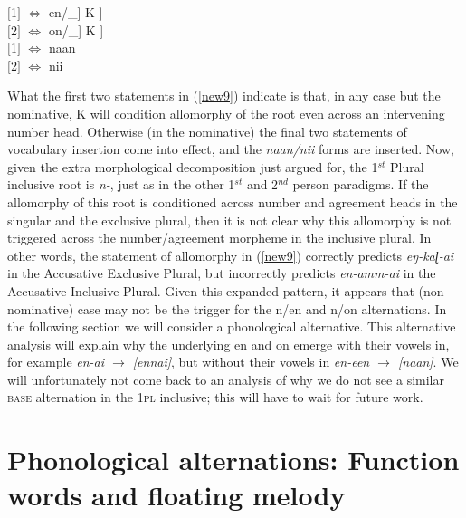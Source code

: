\documentclass[output=paper,colorlinks,citecolor=brown,
]{langscibook}
\begin{document}
\begin{exe}
\ex \label{new9}
$[$1$]$ \hspace{6pt} $\Leftrightarrow$  \hspace{5pt}    en/\_] K ] \\
$[$2$]$ \hspace{5pt} $\Leftrightarrow$  \hspace{5pt}    on/\_] K ] \\
$[$1$]$ \hspace{6pt} $\Leftrightarrow$  \hspace{5pt}  naan\\
$[$2$]$ \hspace{5pt} $\Leftrightarrow$  \hspace{5pt}  nii\\
\end{exe}

What the first two statements in (\ref{new9}) indicate is that, in any case but the nominative, K will condition allomorphy of the root even across an intervening number head. Otherwise (in the nominative) the final two statements of vocabulary insertion come into effect, and the \textit{naan/nii} forms are inserted. Now, given the extra morphological decomposition just argued for, the 1$^{st}$ Plural inclusive root is\textit{ n-}, just as in the other 1$^{st}$ and 2$^{nd}$ person paradigms. If the allomorphy of this root is conditioned across number and agreement heads in the singular and the exclusive plural, then it is not clear why this allomorphy is not triggered across the number/agreement morpheme in the inclusive plural. In other words, the statement of allomorphy in (\ref{new9}) correctly predicts \textit{eŋ-kaɭ-ai} in the Accusative Exclusive Plural, but incorrectly predicts	 \textit{en-amm-ai} in the Accusative Inclusive Plural. Given this expanded pattern, it appears that (non-nominative) case may not be the trigger for the n/en and n/on alternations. In the following section we will consider a phonological alternative. This alternative analysis will explain why the underlying en and on emerge with their vowels in, for example \textit{en-ai $\rightarrow$ [ennai]}, but without their vowels in \textit{en-een $\rightarrow$ [naan]}. We will unfortunately not come back to an analysis of why we do not see a similar \textsc{base} alternation in the 1\textsc{pl} inclusive; this will have to wait for future work.

\section{Phonological alternations: Function words and floating melody}
\end{document}
